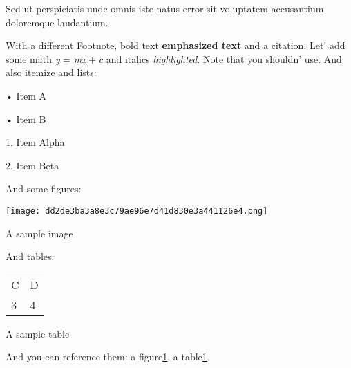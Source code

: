 Sed ut perspiciatis unde omnis iste natus error sit voluptatem
accusantium doloremque laudantium.

With a different Footnote, bold text \textbf{emphasized text} and a
citation. Let' add some math \emph{y} = \emph{mx} + \emph{c} and italics
\emph{highlighted}. Note that you shouldn' use. And also itemize and
lists:

• Item A

• Item B

1. Item Alpha

2. Item Beta

And some figures:

\texttt{[image: dd2de3ba3a8e3c79ae96e7d41d830e3a441126e4.png]}

A sample image

And tables:

\begin{longtable}[]{@{}ll@{}}
\toprule\noalign{}
\endhead
\bottomrule\noalign{}
\endlastfoot
C & D \\
3 & 4 \\
\end{longtable}

A sample table

And you can reference them: a
figure\ul{\protect\hyperlink{fig:sample}{1}}, a
table\ul{\protect\hyperlink{tab:sample}{1}}.
